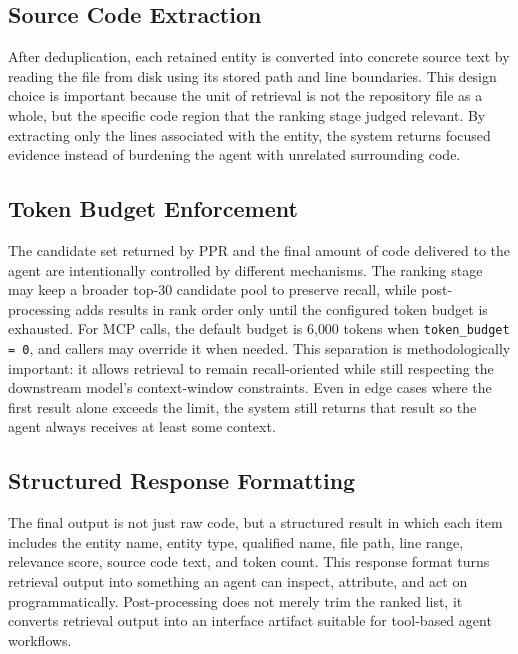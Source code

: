 \subsection{Source Code Extraction}
\label{sec:source-extraction}

After deduplication, each retained entity is converted into concrete source text by reading the file from disk using its stored path and line boundaries. This design choice is important because the unit of retrieval is not the repository file as a whole, but the specific code region that the ranking stage judged relevant. By extracting only the lines associated with the entity, the system returns focused evidence instead of burdening the agent with unrelated surrounding code.

\subsection{Token Budget Enforcement}
\label{sec:token-budget}

The candidate set returned by PPR and the final amount of code delivered to the agent are intentionally controlled by different mechanisms. The ranking stage may keep a broader top-30 candidate pool to preserve recall, while post-processing adds results in rank order only until the configured token budget is exhausted. For MCP calls, the default budget is 6{,}000 tokens when \texttt{token\_budget = 0}, and callers may override it when needed. This separation is methodologically important: it allows retrieval to remain recall-oriented while still respecting the downstream model's context-window constraints. Even in edge cases where the first result alone exceeds the limit, the system still returns that result so the agent always receives at least some context.

\subsection{Structured Response Formatting}
\label{sec:structured-response}

The final output is not just raw code, but a structured result in which each item includes the entity name, entity type, qualified name, file path, line range, relevance score, source code text, and token count. This response format turns retrieval output into something an agent can inspect, attribute, and act on programmatically. Post-processing does not merely trim the ranked list, it converts retrieval output into an interface artifact suitable for tool-based agent workflows.

